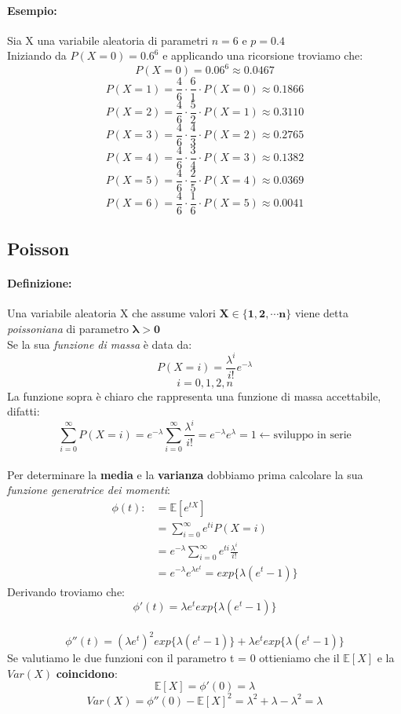 \documentclass[]{article}
\newcommand{\ev}{\mathbb{E}[X]}
\renewcommand{\ev}[1]{\mathbb{E}[#1]}
\newcommand{\definizione}{\paragraph{Definizione:}}
\begin{document}
    \paragraph{Esempio:} Sia X una variabile aleatoria di parametri $n = 6$ e $p = 0.4$ \\
    Iniziando da $P(X = 0) = 0.6^6$ e applicando una ricorsione troviamo che:
    \[ P(X = 0) = 0.06^6 \approx 0.0467 \]
    \[ P(X = 1) = \frac{4}{6} \cdot \frac{6}{1} \cdot P(X = 0) \approx 0.1866 \]
    \[ P(X = 2) = \frac{4}{6} \cdot \frac{5}{2} \cdot P(X = 1) \approx 0.3110 \]
    \[ P(X = 3) = \frac{4}{6} \cdot \frac{4}{3} \cdot P(X = 2) \approx 0.2765 \]
    \[ P(X = 4) = \frac{4}{6} \cdot \frac{3}{4} \cdot P(X = 3) \approx 0.1382 \]
    \[ P(X = 5) = \frac{4}{6} \cdot \frac{2}{5} \cdot P(X = 4) \approx 0.0369 \]
    \[ P(X = 6) = \frac{4}{6} \cdot \frac{1}{6} \cdot P(X = 5) \approx 0.0041 \]
    \subsection{Poisson}
    \definizione Una variabile aleatoria X che assume valori $\boldsymbol{X \in \{1,2, \cdots n\}}$ viene detta \textit{poissoniana} di parametro $\boldsymbol{\lambda > 0}$ \\
    Se la sua \textit{funzione di massa} è data da:
    \[ P(X = i) = \frac{\lambda^i}{i!} e^{-\lambda} \]
    \[ i = 0,1,2,n \]
    La funzione sopra è chiaro che rappresenta una funzione di massa accettabile, difatti:
    \[ \sum_{i = 0}^{\infty} P(X = i) = e^{-\lambda} \sum_{i = 0}^{\infty} \frac{\lambda^i}{i!} = e^{-\lambda} e^\lambda = 1 \leftarrow \text{sviluppo in serie} \] \\ 
    Per determinare la \textbf{media} e la \textbf{varianza} dobbiamo prima calcolare la sua \textit{funzione generatrice dei momenti}:
    \begin{equation*}
        \begin{split}
            \phi (t) : & = \ev{e^{tX}} \\ 
            & = \sum_{i = 0}^{\infty} e^{ti} P(X = i) \\
            & = e^{-\lambda} \sum_{i = 0}^{\infty} e^{ti} \frac{\lambda^i}{i!} \\
            & = e^{-\lambda} e^{\lambda e^t} = exp\{\lambda(e^t - 1)\}
        \end{split}
    \end{equation*}
    Derivando troviamo che:
    \[ \phi'(t) = \lambda e^t exp\{\lambda(e^t - 1) \} \] \\
    \[ \phi''(t) = (\lambda e^t)^2 exp\{\lambda(e^t - 1)\} + \lambda e^t exp\{\lambda(e^t - 1)\} \]
    Se valutiamo le due funzioni con il parametro t = 0 ottieniamo che il $\ev{X}$ e la $Var(X)$ \textbf{coincidono}:
    \[ \ev{X} = \phi'(0) = \lambda \]
    \[ Var(X) = \phi''(0) - \ev{X}^2 = \lambda^2 + \lambda - \lambda^2 = \lambda \]
\end{document}
